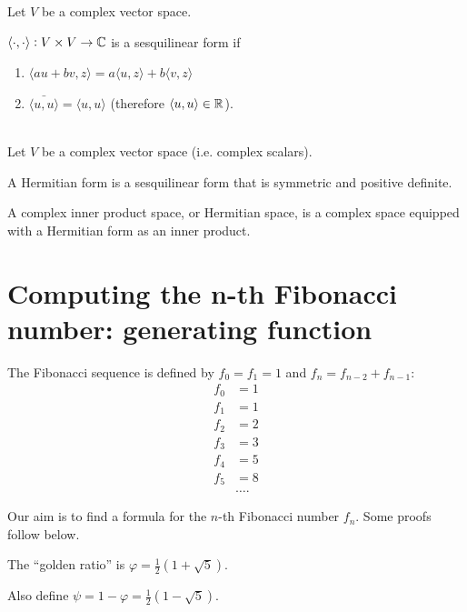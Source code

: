 \begin{definition*}
  Let $V$ be a complex vector space.

  $\langle \cdot, \cdot \rangle:V \times V \to \mathbb{C}$ is a sesquilinear form if
  \begin{enumerate}
  \item $\langle au + bv, z \rangle = a\langle u, z \rangle + b\langle v, z \rangle$
  \item $\bar{\langle u, u \rangle} = \langle u, u \rangle$ (therefore
    $\langle u, u \rangle \in \mathbb{R}$).
  \end{enumerate}
\end{definition*}


\begin{definition*}~\\
  Let $V$ be a complex vector space (i.e. complex scalars).

  A Hermitian form is a sesquilinear form that is symmetric and positive definite.

  A complex inner product space, or Hermitian space, is a complex space equipped with a Hermitian
  form as an inner product.
\end{definition*}

\section{Computing the n-th Fibonacci number: generating function}

\begin{definition}
  The Fibonacci sequence is defined by $f_0 = f_1 = 1$ and $f_n = f_{n-2} + f_{n-1}$:
  \begin{align*}
    f_0 &= 1\\
    f_1 &= 1\\
    f_2 &= 2\\
    f_3 &= 3\\
    f_4 &= 5\\
    f_5 &= 8\\
    &\ldots.
  \end{align*}
\end{definition}

Our aim is to find a formula for the $n$-th Fibonacci number $f_n$. Some proofs follow below.


\begin{definition}
  The ``golden ratio​'' is $\varphi = \frac{1}{2}(1 + \sqrt 5)$.

  Also define $\psi = 1 - \varphi = \frac{1}{2}(1 - \sqrt 5)$.
\end{definition}

